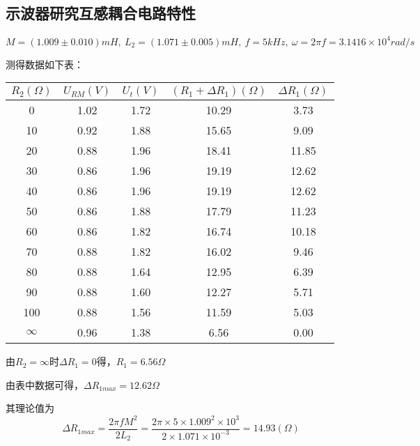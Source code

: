 \documentclass{thureport}
\begin{document}
\subsection{示波器研究互感耦合电路特性}
$M=(1.009\pm0.010)mH,\ L_2=(1.071\pm0.005)mH,\ f=5kHz,\ \omega=2\pi f=3.1416\times10^4rad/s$

测得数据如下表：

\begin{table}[htbp]
    \centering
      \begin{tabular}{|c|c|c|c|c|}
      \hline
      $R_2(\Omega)$ & $U_{RM}(V)$ & $U_t(V)$ & $(R_1+\Delta R_1)(\Omega)$ & $\Delta R_1(\Omega)$ \bigstrut\\
      \hline
      0     & 1.02  & 1.72  & 10.29  & 3.73  \bigstrut\\
      \hline
      10    & 0.92  & 1.88  & 15.65  & 9.09  \bigstrut\\
      \hline
      20    & 0.88  & 1.96  & 18.41  & 11.85  \bigstrut\\
      \hline
      30    & 0.86  & 1.96  & 19.19  & 12.62  \bigstrut\\
      \hline
      40    & 0.86  & 1.96  & 19.19  & 12.62  \bigstrut\\
      \hline
      50    & 0.86  & 1.88  & 17.79  & 11.23  \bigstrut\\
      \hline
      60    & 0.86  & 1.82  & 16.74  & 10.18  \bigstrut\\
      \hline
      70    & 0.88  & 1.82  & 16.02  & 9.46  \bigstrut\\
      \hline
      80    & 0.88  & 1.64  & 12.95  & 6.39  \bigstrut\\
      \hline
      90    & 0.88  & 1.60  & 12.27  & 5.71  \bigstrut\\
      \hline
      100   & 0.88  & 1.56  & 11.59  & 5.03  \bigstrut\\
      \hline
      $\infty$ & 0.96  & 1.38  & 6.56  & 0.00  \bigstrut\\
      \hline
      \end{tabular}%
  \end{table}%
  
  

由$R_2=\infty$时$\Delta R_1=0$得，$R_1=6.56\Omega$

由表中数据可得，$\Delta R_{1max}=12.62\Omega$

其理论值为$$\Delta R_{1max}=\frac{2\pi fM^2}{2L_2}=\frac{2\pi\times5\times1.009^2\times10^3}{2\times1.071\times10^{-3}}=14.93(\Omega)$$
\end{document}
